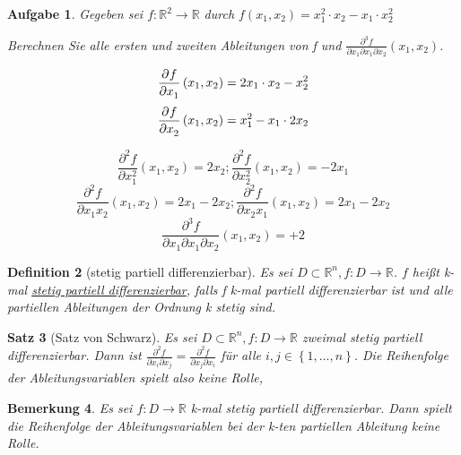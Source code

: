 \documentclass[fontset=ubuntu,12pt,a4paper]{scrreprt}
\newtheorem{defi}{Definition}[section]
\newtheorem{bemerkung}[defi]{Bemerkung}
\newtheorem{satz}[defi]{Satz}
\newtheorem{aufg}[defi]{Aufgabe}
\begin{document}
\begin{aufg}
    Gegeben sei \(f:\mathbb{R}^2\to\mathbb{R}\) durch \(f(x_1,x_2)=x_1^2 \cdot x_2 - x_1 \cdot x_2^2\)

    Berechnen Sie alle ersten und zweiten Ableitungen von f und \(\frac{\partial^3 f}{\partial x_1 \partial x_1 \partial x_2}(x_1,x_2)\).

    \[\dpd{f}{x_1}(x_1,x_2)=2x_1 \cdot x_2 - x_2^2 \]
    \[\dpd{f}{x_2}(x_1,x_2)=x_1^2 - x_1 \cdot 2x_2 \]

    \[\frac{\partial^2 f}{\partial x_1^2}(x_1,x_2)=2x_2 ; \frac{\partial^2 f}{\partial x_2^2}(x_1,x_2)=-2x_1 \]
    \[\frac{\partial^2 f}{\partial x_1x_2}(x_1,x_2)=2x_1-2x_2 ; \frac{\partial^2 f}{\partial x_2x_1}(x_1,x_2)=2x_1-2x_2 \]
    \[\frac{\partial^3 f}{\partial x_1 \partial x_1 \partial x_2}(x_1,x_2)=+2\]
\end{aufg}

\begin{defi}[stetig partiell differenzierbar]
    Es sei \(D\subset\mathbb{R}^n,f:D\to\mathbb{R}\). \(f\) heißt k-mal \underline{stetig partiell differenzierbar}, falls f k-mal partiell differenzierbar ist und alle partiellen Ableitungen der Ordnung k stetig sind.
\end{defi}

\begin{satz}[Satz von Schwarz]
    Es sei \(D\subset\mathbb{R}^n,f:D\to\mathbb{R}\) zweimal stetig partiell differenzierbar. Dann ist \(\frac{\partial^2 f}{\partial x_i \partial x_j}=\frac{\partial^2 f}{\partial x_j \partial x_i}\) für alle \(i,j\in\left\{1,\dots,n\right\}\). Die Reihenfolge der Ableitungsvariablen spielt also keine Rolle,
\end{satz}

\begin{bemerkung}
    Es sei \(f:D\to\mathbb{R}\) k-mal stetig partiell differenzierbar. Dann spielt die Reihenfolge der Ableitungsvariablen bei der k-ten partiellen Ableitung keine Rolle.
\end{bemerkung}
\end{document}
